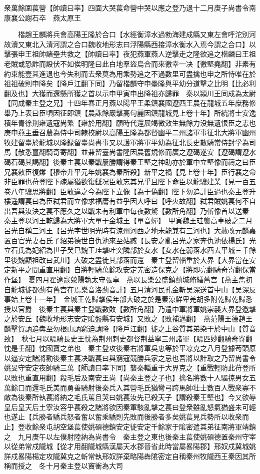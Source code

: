 衆萬餘圍萇營【帥讀曰率】四面大哭萇命營中哭以應之登乃退十二月庚子尚書令南康襄公謝石卒　燕太原王

　　楷趙王麟將兵會高陽王隆於合口【水經衡漳水過勃海建成縣又東左會呼沱别河故瀆又東北入清河謂之合口魏收地形志曰浮陽縣西接漳水衡水入焉今謂之合口】以擊張申王祖帥諸壘共救之【帥讀曰率】夜犯燕軍燕人逆擊走之隆欲追之楷麟曰王祖老賊或恐詐而設伏不如俟明隆曰此白地羣盜烏合而來徼幸一决【徼堅堯翻】非素有約束能壹其進退也今失利而去衆莫為用乘勢追之不過數里可盡擒也申之所恃唯在於祖祖破則申降矣【降戶江翻下同】乃留楷麟守申壘隆與平幼分道擊之比明【比必利翻及也】大獲而還懸所獲之首以示申甲寅申出降祖亦歸罪　秦以潁川王同成為太尉【同成秦主登之兄】十四年春正月燕以陽平王柔鎮襄國遼西王農在龍城五年庶務修舉乃上表曰臣頃因征即鎮【農誅餘巖擊高句麗因鎮龍城見上卷十年】所統將士安逸積年青徐荆雍遺寇尚繁【雍於用翻】願時代還展竭微效生無餘力没無遺恨臣之志也庚申燕主垂召農為侍中司隸校尉以高陽王隆為都督幽平二州諸軍事征北大將軍幽州牧建留臺於龍城以隆録留臺尚書事又以護軍將軍平幼為征北長史散騎常侍封孚為司馬【散悉亶翻騎奇寄翻】並兼留臺尚書隆因農舊規修而廣之遼碣遂安【遼碣謂遼水碣石碣其謁翻】後秦主萇以秦戰屢勝謂得秦王堅之神助亦於軍中立堅像而禱之曰臣兄襄敕臣復讎【穆帝升平元年姚襄為秦所殺】新平之禍【見上卷十年】臣行襄之命非臣罪也苻登陛下疎屬猶欲復讎况臣敢忘其兄乎且陛下命臣以龍驤建業【見一百五卷八年驤思將翻】臣敢違之今為陛下立像【為于偽翻】陛下勿追計臣過也秦主登升樓遥謂萇曰為臣弑君而立像求福庸有益乎因大呼曰【呼火故翻】弑君賊姚萇何不自出吾與汝決之萇不應久之以戰未有利軍中每夜數驚【數所角翻】乃斬像首以送秦　秦主登以河王乾歸為大將軍大單于金城王【單音蟬】　甲寅魏王珪襲高車破之二月呂光自稱三河王【呂光字世明光時有涼州河西之地未能兼有三河也】大赦改元麟嘉置百官光妻石氏子紹弟德世自仇池來至姑臧【長安之亂呂光之家奔仇池依楊氏】光立石氏為妃紹為世子癸巳魏王珪擊吐突隣部於女水【女水在弱落水西去平城三千餘里後魏顯祖改曰武川】大破之盡徙其部落而還　秦主登留輜重於大界【大界當在安定新平之間重直用翻】自將輕騎萬餘攻安定羌密造保克之【將即亮翻騎奇寄翻保當作堡】　夏四月翟遼寇滎陽執太守張卓　燕以長樂公盛鎮薊城脩繕舊宫【燕主雋初自龍城徙都薊有舊宫在焉樂音洛薊音計】五月清河民孔金斬吴深送首中山【吴深反事始上卷十一年】　金城王乾歸擊侯年部大破之於是秦涼鮮卑羌胡多附乾歸乾歸悉授以官爵　後秦主萇與秦主登戰數敗【數所角翻】乃遣中軍將軍姚崇襲大界登邀擊之於安丘【魏收地形志安定隂盤縣有安城】又敗之【敗補邁翻】　燕范陽王德趙王麟擊賀訥追犇至勿根山訥窮迫請降【降戶江翻】徙之上谷質其弟染干於中山【質音致】　秋七月以驃騎長史王忱為荆州刺史都督荆益寧三州諸軍【驃匹妙翻騎奇寄翻忱是壬翻】忱國寶之弟也　秦主登攻後秦右將軍吳忠等於平凉克之八月登據苟頭原以逼安定諸將勸後秦主萇决戰萇曰與窮寇競勝兵家之忌也吾將以計取之乃留尚書令姚旻守安定夜帥騎三萬【師讀曰率下同】襲秦輜重于大界克之【重戰輕防此苻登所以敗也重直用翻】殺毛后及南安王尚【尚秦主登之子也】擒名將數十人驅掠男女五萬餘口而還毛氏美而勇善騎射後秦兵入其營毛氏猶彎弓跨馬帥壮士數百人戰衆寡不敵為後秦所執萇將納之毛氏罵且哭曰姚萇汝先已殺天子【謂殺秦王堅也】今又欲辱皇后皇天后土寧汝容乎萇殺之諸將欲因秦軍駭亂擊之萇曰登衆雖亂怒氣猶盛未可輕也遂止【兵勝者驕兵怒者奮以奮乘驕則先敗而後勝者多矣姚萇見兵勢所以收衆而止】登收餘衆屯胡空堡萇使姚碩德鎮安定徙安定千餘家于隂密遣其弟征南將軍靖鎮之　九月庚午以左僕射陸納為尚書令　秦主登之東也後秦主萇使姚碩德置秦州守宰以從弟常戍隴城【從才用翻隴城縣漢屬天水郡晉省此時當屬畧陽郡】邢奴戍冀城姚詳戍畧陽楊定攻隴冀克之斬常執邢奴詳棄略陽犇隂密定自稱秦州牧隴西王秦因其所稱而授之　冬十月秦主登以竇衝為大司
